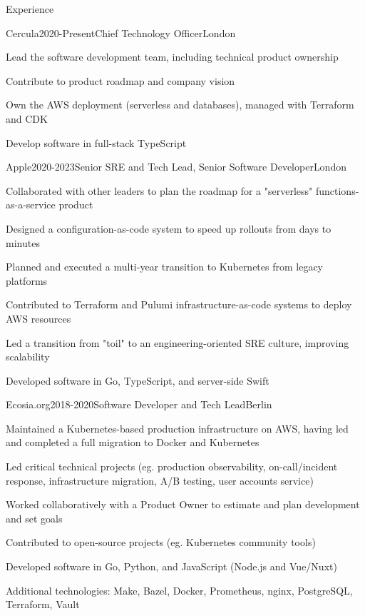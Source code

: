 \documentclass{resume} %
\begin{document}
\vspace{5 mm}

\begin{rSection}{Experience}

\begin{rSubsection}{{Cercula}}{2020-Present}{Chief Technology Officer}{London}
    \item Lead the software development team, including technical product ownership
    \item Contribute to product roadmap and company vision
    \item Own the AWS deployment (serverless and databases), managed with Terraform and CDK
    \item Develop software in full-stack TypeScript
\end{rSubsection}

\begin{rSubsection}{{Apple}}{2020-2023}{Senior SRE and Tech Lead, Senior Software Developer}{London}
    \item Collaborated with other leaders to plan the roadmap for a "serverless" functions-as-a-service product
    \item Designed a configuration-as-code system to speed up rollouts from days to minutes
    \item Planned and executed a multi-year transition to Kubernetes from legacy platforms
    \item Contributed to Terraform and Pulumi infrastructure-as-code systems to deploy AWS resources
    \item Led a transition from "toil" to an engineering-oriented SRE culture, improving scalability
    \item Developed software in Go, TypeScript, and server-side Swift
\end{rSubsection}

\begin{rSubsection}{{Ecosia.org}}{2018-2020}{Software Developer and Tech Lead}{Berlin}
    \item Maintained a Kubernetes-based production infrastructure on AWS, having led and completed a full migration to Docker and Kubernetes
    \item Led critical technical projects (eg. production observability, on-call/incident response, infrastructure migration, A/B testing, user accounts service)
    \item Worked collaboratively with a Product Owner to estimate and plan development and set goals
    \item Contributed to open-source projects (eg. Kubernetes community tools)
    \item Developed software in Go, Python, and JavaScript (Node.js and Vue/Nuxt)
    \item Additional technologies: Make, Bazel, Docker, Prometheus, nginx, PostgreSQL, Terraform, Vault
\end{rSubsection}


\end{rSection}
\end{document}

